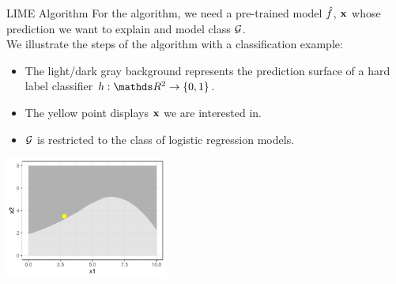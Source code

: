 \documentclass[11pt,compress,t,notes=noshow, aspectratio=169, xcolor=table]{beamer}
\begin{document}
\begin{vbframe}{LIME Algorithm}
		For the algorithm, we need a pre-trained model $\fh$, $\xv$ whose prediction we want to explain and model class $\Gspace$.\\ \vspace{0.5cm}
		We illustrate the steps of the algorithm with a classification example: 
		\begin{itemize}
			\item The light/dark gray background represents the prediction surface of a hard label classifier $h: \R^2 \to \{0, 1\}$.
			\item The yellow point displays $\xv$ we are interested in. 
			\item $\Gspace$ is restricted to the class of logistic regression models. 
		\end{itemize}
		\begin{center}
			\includegraphics[width=0.4\textwidth]{figure/lime2}
		\end{center}
	
\end{vbframe} 
\end{document}
